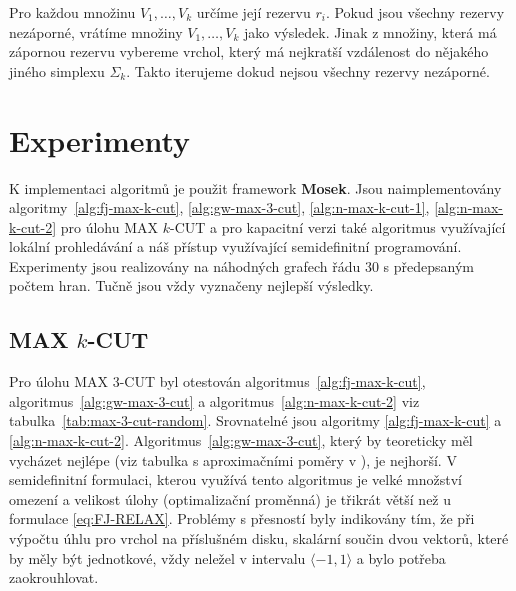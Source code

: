 Pro každou množinu $V_1, \dots, V_k$ určíme její rezervu $r_i$. Pokud jsou všechny rezervy nezáporné, vrátíme množiny $V_1, \dots, V_k$ jako výsledek. Jinak z množiny, která má zápornou rezervu vybereme vrchol, který má nejkratší vzdálenost do nějakého jiného  simplexu $\Sigma_k$. Takto iterujeme dokud nejsou všechny rezervy nezáporné.

\section{Experimenty}

K implementaci algoritmů je použit framework \textbf{Mosek}. Jsou naimplementovány algoritmy~\ref{alg:fj-max-k-cut}, \ref{alg:gw-max-3-cut}, \ref{alg:n-max-k-cut-1}, \ref{alg:n-max-k-cut-2} pro úlohu MAX $k$-CUT a pro kapacitní verzi také algoritmus využívající lokální prohledávání a náš přístup využívající semidefinitní programování. Experimenty jsou realizovány na náhodných grafech řádu $30$ s předepsaným počtem hran. Tučně jsou vždy vyznačeny nejlepší výsledky.


\subsection{MAX $k$-CUT}

Pro úlohu MAX $3$-CUT byl otestován algoritmus~\ref{alg:fj-max-k-cut}, algoritmus~\ref{alg:gw-max-3-cut} a algoritmus~\ref{alg:n-max-k-cut-2} viz tabulka~\ref{tab:max-3-cut-random}. Srovnatelné jsou algoritmy \ref{alg:fj-max-k-cut} a \ref{alg:n-max-k-cut-2}. Algoritmus~\ref{alg:gw-max-3-cut}, který by teoreticky měl vycházet nejlépe (viz tabulka s aproximačními poměry v \cite{newman}), je nejhorší. V semidefinitní formulaci, kterou využívá tento algoritmus je velké množství omezení a velikost úlohy (optimalizační proměnná) je třikrát větší než u formulace \ref{eq:FJ-RELAX}. Problémy s přesností byly indikovány tím, že při výpočtu úhlu pro vrchol na příslušném disku, skalární součin dvou vektorů, které by měly být jednotkové, vždy neležel v intervalu $\langle -1, 1 \rangle$ a bylo potřeba zaokrouhlovat.

